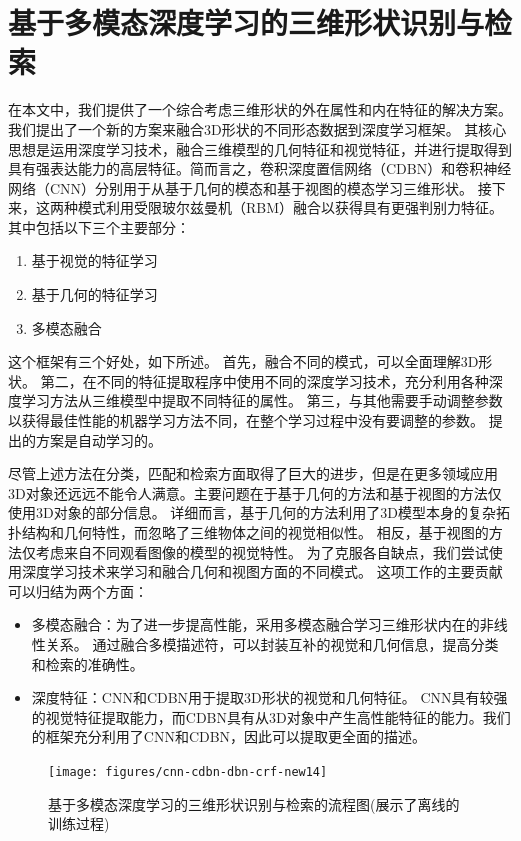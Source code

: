 
\chapter{基于多模态深度学习的三维形状识别与检索}

在本文中，我们提供了一个综合考虑三维形状的外在属性和内在特征的解决方案。 我们提出了一个新的方案来融合3D形状的不同形态数据到深度学习框架。 其核心思想是运用深度学习技术，融合三维模型的几何特征和视觉特征，并进行提取得到具有强表达能力的高层特征。简而言之，卷积深度置信网络（CDBN）和卷积神经网络（CNN）分别用于从基于几何的模态和基于视图的模态学习三维形状。 接下来，这两种模式利用受限玻尔兹曼机（RBM）融合以获得具有更强判别力特征。其中包括以下三个主要部分：
\begin{enumerate}
\item 基于视觉的特征学习
\item 基于几何的特征学习
\item 多模态融合
\end{enumerate}


这个框架有三个好处，如下所述。 首先，融合不同的模式，可以全面理解3D形状。 第二，在不同的特征提取程序中使用不同的深度学习技术，充分利用各种深度学习方法从三维模型中提取不同特征的属性。 第三，与其他需要手动调整参数以获得最佳性能的机器学习方法不同，在整个学习过程中没有要调整的参数。 提出的方案是自动学习的。

尽管上述方法在分类，匹配和检索方面取得了巨大的进步，但是在更多领域应用3D对象还远远不能令人满意。主要问题在于基于几何的方法和基于视图的方法仅使用3D对象的部分信息。 详细而言，基于几何的方法利用了3D模型本身的复杂拓扑结构和几何特性，而忽略了三维物体之间的视觉相似性。 相反，基于视图的方法仅考虑来自不同观看图像的模型的视觉特性。 为了克服各自缺点，我们尝试使用深度学习技术来学习和融合几何和视图方面的不同模式。 这项工作的主要贡献可以归结为两个方面：
\begin{itemize}

\item 多模态融合：为了进一步提高性能，采用多模态融合学习三维形状内在的非线性关系。 通过融合多模描述符，可以封装互补的视觉和几何信息，提高分类和检索的准确性。
\item 深度特征：CNN和CDBN用于提取3D形状的视觉和几何特征。 CNN具有较强的视觉特征提取能力，而CDBN具有从3D对象中产生高性能特征的能力。我们的框架充分利用了CNN和CDBN，因此可以提取更全面的描述。

\end{itemize}



\begin{figure}[htbp]
\begin{center}
 \texttt{[image: figures/cnn-cdbn-dbn-crf-new14]}
 \end{center} \vspace{-4mm}
\caption{基于多模态深度学习的三维形状识别与检索的流程图(展示了离线的训练过程)%
} 
\label{flowchart}
\end{figure}

